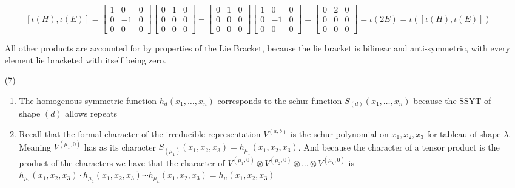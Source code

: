 \documentclass[12pt]{amsart}
\begin{document}
\begin{itemize}
    \[[\iota(H),\iota(E)]=\begin{bmatrix}
        1&0&0\\0&-1&0\\0&0&0
    \end{bmatrix}\begin{bmatrix}
        0&1&0\\0&0&0\\0&0&0
    \end{bmatrix}-\begin{bmatrix}
        0&1&0\\0&0&0\\0&0&0
    \end{bmatrix}\begin{bmatrix}
        1&0&0\\0&-1&0\\0&0&0
    \end{bmatrix}=\begin{bmatrix}
        0&2&0\\0&0&0\\0&0&0
    \end{bmatrix} =\iota(2E) = \iota([\iota(H),\iota(E)])\]

    All other products are accounted for by properties of the Lie Bracket, because the lie bracket is bilinear 
    and anti-symmetric, with every element lie bracketed with itself being zero.\\

    \item[(7)] %
    \begin{enumerate}[label=(\alph*)]
        \item %
        The homogenous symmetric function $h_d(x_1,\dots, x_n)$ corresponds to the schur function 
        $S_{(d)}(x_1,\dots,x_n)$ because the SSYT of shape $(d)$ allows repeats 
        \item %
        Recall that the formal character of the irreducible representation 
        $V^{(a,b)}$ is the schur polynomial on $x_1,x_2,x_3$ for tableau of shape $\lambda$. Meaning
        $V^{(\mu_1,0)}$ has as its character $S_{(\mu_1)}(x_1,x_2,x_3)=h_{\mu_1}(x_1,x_2,x_3)$.
        And because the character of a tensor product is the product of the characters we have that 
        the character of $V^{(\mu_1,0)}\otimes V^{(\mu_2,0)}\otimes \dots \otimes V^{(\mu_k,0)}$
        is $h_{\mu_1}(x_1,x_2,x_3)\cdot h_{\mu_2}(x_1,x_2,x_3)\cdots h_{\mu_k}(x_1,x_2,x_3)= h_\mu(x_1,x_2,x_3)$
    \end{enumerate}
\end{itemize}
\end{document}
